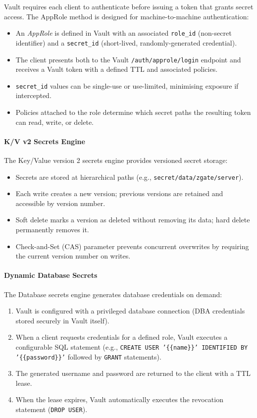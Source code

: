 Vault requires each client to authenticate before issuing a token that grants secret access. The AppRole method is designed for machine-to-machine authentication:

\begin{itemize}
    \item An \emph{AppRole} is defined in Vault with an associated \texttt{role\_id} (non-secret identifier) and a \texttt{secret\_id} (short-lived, randomly-generated credential).
    \item The client presents both to the Vault \texttt{/auth/approle/login} endpoint and receives a Vault token with a defined TTL and associated policies.
    \item \texttt{secret\_id} values can be single-use or use-limited, minimising exposure if intercepted.
    \item Policies attached to the role determine which secret paths the resulting token can read, write, or delete.
\end{itemize}

\paragraph{K/V v2 Secrets Engine}

The Key/Value version 2 secrets engine provides versioned secret storage:

\begin{itemize}
    \item Secrets are stored at hierarchical paths (e.g., \texttt{secret/data/zgate/server}).
    \item Each write creates a new version; previous versions are retained and accessible by version number.
    \item Soft delete marks a version as deleted without removing its data; hard delete permanently removes it.
    \item Check-and-Set (CAS) parameter prevents concurrent overwrites by requiring the current version number on writes.
\end{itemize}

\paragraph{Dynamic Database Secrets}

The Database secrets engine generates database credentials on demand:
\begin{enumerate}
    \item Vault is configured with a privileged database connection (DBA credentials stored securely in Vault itself).
    \item When a client requests credentials for a defined role, Vault executes a configurable SQL statement (e.g., \texttt{CREATE USER '\{\{name\}\}' IDENTIFIED BY '\{\{password\}\}'} followed by \texttt{GRANT} statements).
    \item The generated username and password are returned to the client with a TTL lease.
    \item When the lease expires, Vault automatically executes the revocation statement (\texttt{DROP USER}).
\end{enumerate}

